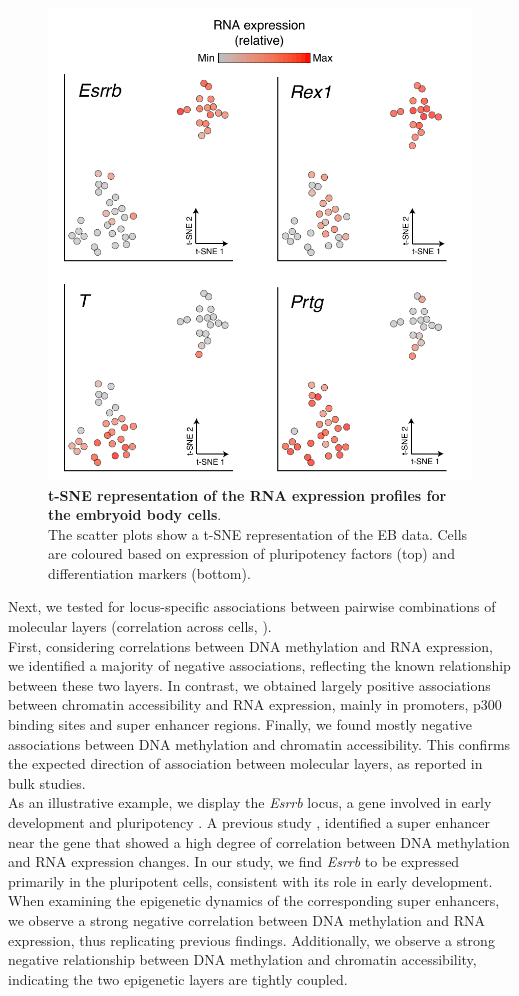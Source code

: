 \begin{figure}[H]
	\centering
	\includegraphics[width=0.65\linewidth]{scNMT_EB_RNA}
	\caption[]{\textbf{t-SNE representation of the RNA expression profiles for the embryoid body cells}.\\
	The scatter plots show a t-SNE representation of the EB data. Cells are coloured based on expression of pluripotency factors (top) and differentiation markers (bottom). }
	\label{fig:scnmt_eb_rna}
\end{figure}

Next, we tested for locus-specific associations between pairwise combinations of molecular layers (correlation across cells, ).\\
First, considering correlations between DNA methylation and RNA expression, we identified a majority of negative associations, reflecting the known relationship between these two layers. In contrast, we obtained largely positive associations between chromatin accessibility and RNA expression, mainly in promoters, p300 binding sites and super enhancer regions. Finally, we found mostly negative associations between DNA methylation and chromatin accessibility. This confirms the expected direction of association between molecular layers, as reported in bulk studies.\\
As an illustrative example, we display the \textit{Esrrb} locus, a gene involved in early development and pluripotency \cite{Papp2012}. A previous study \cite{Angermueller2016}, identified a super enhancer near the gene that showed a high degree of correlation between DNA methylation and RNA expression changes. In our study, we find \textit{Esrrb} to be expressed primarily in the pluripotent cells, consistent with its role in early development. When examining the epigenetic dynamics of the corresponding super enhancers, we observe a strong negative correlation between DNA methylation and RNA expression, thus replicating previous findings. Additionally, we observe a strong negative relationship between DNA methylation and chromatin accessibility, indicating the two epigenetic layers are tightly coupled.

